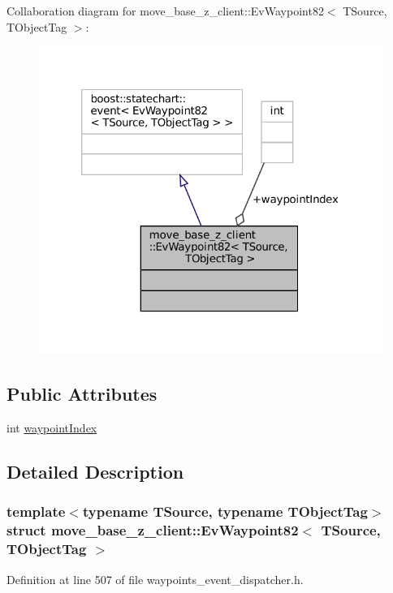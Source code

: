 Collaboration diagram for move\+\_\+base\+\_\+z\+\_\+client\+:\+:Ev\+Waypoint82$<$ T\+Source, T\+Object\+Tag $>$\+:
\nopagebreak
\begin{figure}[H]
\begin{center}
\leavevmode
\includegraphics[width=320pt]{structmove__base__z__client_1_1EvWaypoint82__coll__graph}
\end{center}
\end{figure}
\subsection*{Public Attributes}
\begin{DoxyCompactItemize}
\item 
int \hyperlink{structmove__base__z__client_1_1EvWaypoint82_aa54b98fcf1cf08bd3a694f815614599c}{waypoint\+Index}
\end{DoxyCompactItemize}


\subsection{Detailed Description}
\subsubsection*{template$<$typename T\+Source, typename T\+Object\+Tag$>$\newline
struct move\+\_\+base\+\_\+z\+\_\+client\+::\+Ev\+Waypoint82$<$ T\+Source, T\+Object\+Tag $>$}



Definition at line 507 of file waypoints\+\_\+event\+\_\+dispatcher.\+h.



